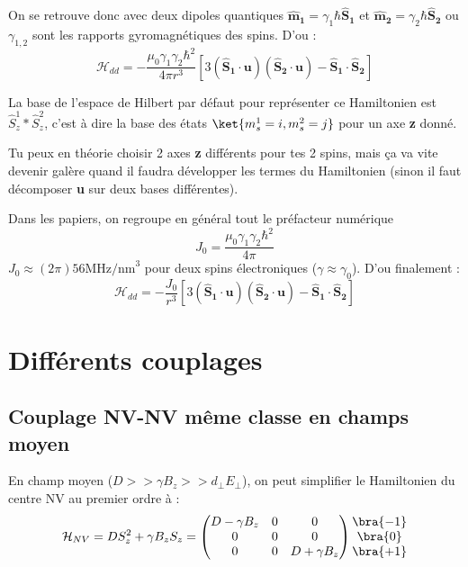 \documentclass[a4paper]{article}
\begin{document}
 On se retrouve donc avec deux dipoles quantiques $\mathbf{\hat{m}_1}= \gamma_1 \hbar \mathbf{\hat{S}_1}$ et $\mathbf{\hat{m}_2}= \gamma_2 \hbar \mathbf{\hat{S}_2}$ ou $\gamma_{1,2}$ sont les rapports gyromagnétiques des spins. D'ou : 
 \begin{equation}
  \mathcal{H}_{dd}=-\frac{\mu_0 \gamma_1 \gamma_2 \hbar ^2}{4 \pi r^3}[3(\mathbf{\hat{S}_1}\cdot \mathbf{u})(\mathbf{\hat{S}_2}\cdot \mathbf{u})-\mathbf{\hat{S}_1}\cdot \mathbf{\hat{S}_2}]
  \end{equation}
  
  La base de l'espace de Hilbert par défaut pour représenter ce Hamiltonien est $\hat{S}_z^1 \ast \hat{S}_z^2$, c'est à dire la base des états $\ket{m_s^1=i,m_s^2=j}$ pour un axe \textbf{z} donné. 
  
  Tu peux en théorie choisir 2 axes \textbf{z} différents pour tes 2 spins, mais ça va vite devenir galère quand il faudra développer les termes du Hamiltonien (sinon il faut décomposer \textbf{u} sur deux bases différentes).
  
  Dans les papiers, on regroupe en général tout le préfacteur numérique 
  \begin{equation}
  J_0=\frac{\mu_0 \gamma_1 \gamma_2 \hbar ^2}{4 \pi}
  \end{equation}
  $J_0 \approx (2\pi)56 \textrm{MHz/nm}^3$ pour deux spins électroniques ($\gamma \approx \gamma_0$). D'ou finalement :
   \begin{equation}
  \mathcal{H}_{dd}=-\frac{J_0}{r^3}[3(\mathbf{\hat{S}_1}\cdot \mathbf{u})(\mathbf{\hat{S}_2}\cdot \mathbf{u})-\mathbf{\hat{S}_1}\cdot \mathbf{\hat{S}_2}]
  \end{equation}
  
  \section{Différents couplages}
  \subsection{Couplage NV-NV même classe en champs moyen}
  En champ moyen ($D >> \gamma B_z >> d_\perp E_\perp$), on peut simplifier le Hamiltonien du centre NV au premier ordre à :
  \begin{equation}
  \mathcal{H}_{NV}=D S_z^2 + \gamma B_z S_z= 
  \begin{pmatrix}
	D-\gamma B_z &0&0 \\
	0 &0&0\\
	0&0& D+ \gamma B_z
  \end{pmatrix}
  \begin{matrix}
  \bra{-1} \\
  \bra{0} \\
  \bra{+1}
  \end{matrix}
  \end{equation}
  
\end{document}
